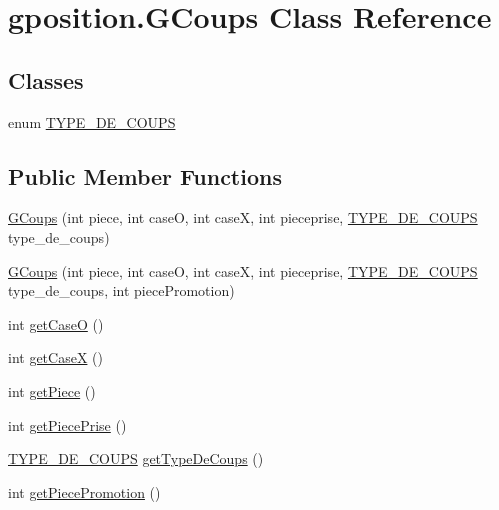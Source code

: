 \hypertarget{classgposition_1_1_g_coups}{\section{gposition.\-G\-Coups Class Reference}
\label{classgposition_1_1_g_coups}
}
\subsection*{Classes}
\begin{DoxyCompactItemize}
\item 
enum \hyperlink{enumgposition_1_1_g_coups_1_1_t_y_p_e___d_e___c_o_u_p_s}{T\-Y\-P\-E\-\_\-\-D\-E\-\_\-\-C\-O\-U\-P\-S}
\end{DoxyCompactItemize}
\subsection*{Public Member Functions}
\begin{DoxyCompactItemize}
\item 
\hyperlink{classgposition_1_1_g_coups_ad144720e175ba6c0fe4b04cfd050f3ee}{G\-Coups} (int piece, int case\-O, int case\-X, int pieceprise, \hyperlink{enumgposition_1_1_g_coups_1_1_t_y_p_e___d_e___c_o_u_p_s}{T\-Y\-P\-E\-\_\-\-D\-E\-\_\-\-C\-O\-U\-P\-S} type\-\_\-de\-\_\-coups)
\item 
\hyperlink{classgposition_1_1_g_coups_a371f7bfa8e488974b8c3a5f4c8ca9502}{G\-Coups} (int piece, int case\-O, int case\-X, int pieceprise, \hyperlink{enumgposition_1_1_g_coups_1_1_t_y_p_e___d_e___c_o_u_p_s}{T\-Y\-P\-E\-\_\-\-D\-E\-\_\-\-C\-O\-U\-P\-S} type\-\_\-de\-\_\-coups, int piece\-Promotion)
\item 
int \hyperlink{classgposition_1_1_g_coups_a42dd5d48f441099a14ed01f1fcb2623e}{get\-Case\-O} ()
\item 
int \hyperlink{classgposition_1_1_g_coups_abd1366668a6cc2eead9ee105438af9c3}{get\-Case\-X} ()
\item 
int \hyperlink{classgposition_1_1_g_coups_a68b9fcacb67f6166e878afe26dfba218}{get\-Piece} ()
\item 
int \hyperlink{classgposition_1_1_g_coups_a8b5e9a9770236146f01f64ae79bf1145}{get\-Piece\-Prise} ()
\item 
\hyperlink{enumgposition_1_1_g_coups_1_1_t_y_p_e___d_e___c_o_u_p_s}{T\-Y\-P\-E\-\_\-\-D\-E\-\_\-\-C\-O\-U\-P\-S} \hyperlink{classgposition_1_1_g_coups_a660e5a128b4c15d899a5e15d40d96836}{get\-Type\-De\-Coups} ()
\item 
int \hyperlink{classgposition_1_1_g_coups_ad3aa165b4d8526195cd9d14e1b2c38d5}{get\-Piece\-Promotion} ()
\end{DoxyCompactItemize}
